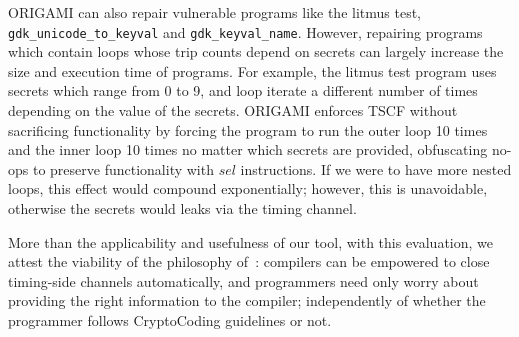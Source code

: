 {ORIGAMI can also repair vulnerable programs like the litmus test, \texttt{gdk\_unicode\_to\_keyval} and \texttt{gdk\_keyval\_name}. 
However, repairing programs which contain loops whose trip counts depend on secrets can largely increase the size and execution time of programs. For example, the litmus test program uses secrets which range from 0 to 9, and loop iterate a different number of times depending on the value of the secrets. ORIGAMI enforces TSCF without sacrificing functionality by forcing the program to run the outer loop 10 times and the inner loop 10 times no matter which secrets are provided, obfuscating no-ops to preserve functionality with $sel$ instructions. If we were to have more nested loops, this effect would compound exponentially; however, this is unavoidable, otherwise the secrets would leaks via the timing channel. 



More than the applicability and usefulness of our tool, with this evaluation, we attest the viability of the philosophy of~\cite{WhatYouCisWhatYouGet}: compilers can be empowered to close timing-side channels automatically, and programmers need only worry about providing the right information to the compiler; independently of whether the programmer follows CryptoCoding guidelines or not.
 

}
